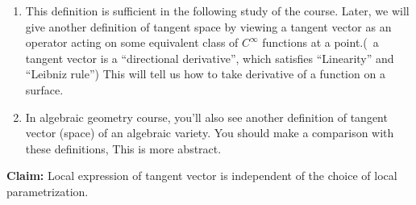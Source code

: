\begin{remark}
    \hfill
    \begin{enumerate}[(1)]
        \item This definition is sufficient in the following study of the
              course. Later, we will give another definition of tangent space
              by viewing a tangent vector as an operator acting on some equivalent
              class of \(C^\infty\) functions at a point.(\ie\ a tangent vector
              is a ``directional derivative'', which satisfies ``Linearity'' and
              ``Leibniz rule'') This will tell us how to take derivative of a
              function on a surface.
        \item In algebraic geometry course, you'll also see another
              definition of tangent vector (space) of an algebraic variety.
              You should make a comparison with these definitions, This is
              more abstract.
    \end{enumerate}
\end{remark}
\textbf{Claim:} Local expression of tangent vector is independent of the choice of
local \\ parametrization.
